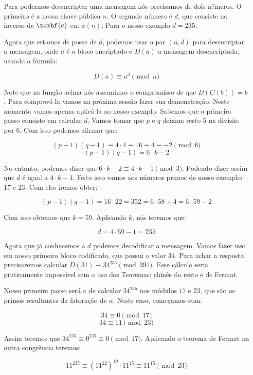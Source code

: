 Para podermos desencriptar uma mensagem n\'os precisamos de dois n?meros. O primeiro \'e a nossa chave p\'ublica $n$. O segundo n\'umero \'e $d$, que consiste no inverso de $\texbf{e}$ em $\phi(n)$. Para o nosso exemplo $d= 235$.

Agora que estamos de posse de $d$, podemos usar o par $(n,d)$ para desencriptar a mensagem, onde $a$ \'e o bloco encriptado e $D(a)$ a mensagem desencriptada, usando a f\'ormula:

$$D(a) \equiv a^d \pmod{n}$$

Note que na fun\c{c}\~ao acima n\'os assumimos o compromisso de que $D(C(b)) = b$. Para comprov\'a-la vamos na pr\'oxima sess\~ao fazer sua demonstra\c{c}\~ao. Neste momento vamos apenas aplic\'a-la ao nosso exemplo. Sabemos que o primeiro passo consiste em calcular $d$. Vamos tomar que $p$ e $q$ deixam resto $5$ na divis\~ao por $6$. Com isso podemos afirmar que:

$$(p-1)(q-1) \equiv 4 \cdot 4 \equiv 16 \equiv 4 \equiv -2 \pmod{6}$$
$$(p-1)(q-1) = 6 \cdot k -2$$

No entanto, podemos dizer que $6 \cdot k - 2 \equiv 4 \cdot k - 1 \pmod{3}$. Podendo dizer assim que $d$ \'e igual a $4 \cdot k -1$. Feito isso vamos aos n\'umeros primos de nosso exemplo: $17$ e $23$. Com eles iremos obter:

$$(p-1)(q-1) = 16 \cdot 22 = 352 = 6 \cdot 58 + 4 = 6\cdot 59 -2$$

Com isso obtemos que $k=59$. Aplicando $k$, n\'os teremos que:

$$d = 4 \cdot 59 - 1 = 235$$

Agora que j\'a conhecemos a $d$ podemos decodificar a mensagem. Vamos fazer isso em nosso primeiro bloco codificado, que possui o valor $34$. Para achar a resposta precisaremos calcular $D(34) \equiv 34^{235} \pmod{391}$. Esse c\'alculo seria praticamente imposs\'ivel sem o uso dos Teoremas: chin\^es do resto e de Fermat.

Nosso primeiro passo ser\'a o de calcular $34^{235}$ nos m\'odulos $17$ e $23$, que s\~ao os primos resultantes da fatora\c{c}\~ao de $n$. Neste caso, come\c{c}amos com:

$$34 \equiv 0 \pmod{17}$$
$$34 \equiv 11 \pmod{23}$$

Assim teremos que $34^{235} \equiv 0^{235} \equiv 0 \pmod{17}$. Aplicando o teorema de Fermat na outra congr\^encia teremos:

$$11^{235} \equiv (11^{22})^{10} \cdot 11^{15} \equiv 11^{15} \pmod{23}$$


